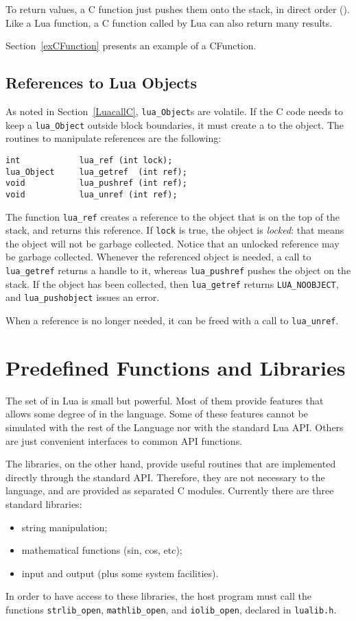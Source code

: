 To return values, a C function just pushes them onto the stack,
in direct order ().
Like a Lua function, a C function called by Lua can also return
many results.

Section~\ref{exCFunction} presents an example of a CFunction.


\subsection{References to Lua Objects}

As noted in Section~\ref{LuacallC}, \verb'lua_Object's are volatile.
If the C code needs to keep a \verb'lua_Object'
outside block boundaries,
it must create a  to the object.
The routines to manipulate references are the following:
\begin{verbatim}
int            lua_ref (int lock);
lua_Object     lua_getref  (int ref);
void           lua_pushref (int ref);
void           lua_unref (int ref);
\end{verbatim}
The function \verb'lua_ref' creates a reference
to the object that is on the top of the stack,
and returns this reference.
If \verb'lock' is true, the object is {\em locked}:
that means the object will not be garbage collected.
Notice that an unlocked reference may be garbage collected.
Whenever the referenced object is needed,
a call to \verb'lua_getref'
returns a handle to it,
whereas \verb'lua_pushref' pushes the object on the stack.
If the object has been collected,
then \verb'lua_getref' returns \verb'LUA_NOOBJECT',
and \verb'lua_pushobject' issues an error.

When a reference is no longer needed,
it can be freed with a call to \verb'lua_unref'.



\section{Predefined Functions and Libraries}

The set of  in Lua is small but powerful.
Most of them provide features that allows some degree of
 in the language.
Some of these features cannot be simulated with the rest of the
Language nor with the standard Lua API.
Others are just convenient interfaces to common API functions.

The libraries, on the other hand, provide useful routines
that are implemented directly through the standard API.
Therefore, they are not necessary to the language,
and are provided as separated C modules.
Currently there are three standard libraries:
\begin{itemize}
\item string manipulation;
\item mathematical functions (sin, cos, etc);
\item input and output (plus some system facilities).
\end{itemize}
In order to have access to these libraries,
the host program must call the functions
\verb-strlib_open-, \verb-mathlib_open-, and \verb-iolib_open-,
declared in \verb-lualib.h-.


